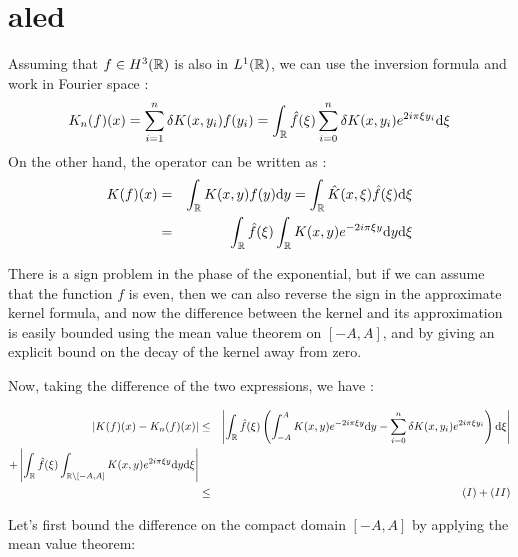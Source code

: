 \documentclass[11pt,a4paper]{article}
\begin{document}
\section{aled}

Assuming that $f\in H^3(\mathbb R)$ is also in $L^1(\mathbb R)$, we can use the inversion formula and work in Fourier space :
\begin{equation}\label{int_finite}
K_n(f)(x) =  \sum_{i=1}^n\delta K(x,y_i)f(y_i) = \int_\mathbb R \hat{f}(\xi)\sum_{i=0}^n \delta K(x,y_i) e^{2i\pi\xi y_i}\mathrm{d}\xi
\end{equation}
On the other hand, the operator can be written as :
\begin{eqnarray*}
K(f)(x) &=& \int_\mathbb R K(x,y)f(y)\mathrm{d}y = \int_\mathbb R \hat{K}(x,\xi)\hat{f}(\xi)\mathrm{d}\xi \\
&=& \int_\mathbb R \hat{f}(\xi) \int_\mathbb R K(x,y)e^{-2i\pi\xi y}\mathrm{d}y \mathrm{d}\xi 
\end{eqnarray*}

There is a sign problem in the phase of the exponential, but if we can assume that the function $f$ is even, then we can also reverse the sign in the approximate kernel formula, and now the difference between the kernel and its approximation is easily bounded using the mean value theorem on $[-A,A]$, and by giving an explicit bound on the decay of the kernel away from zero. 

Now, taking the difference of the two expressions, we have :

\begin{eqnarray*}
\left| K(f)(x) - K_n(f)(x)\right| &\leq& \left|  \int_\mathbb R \hat{f}(\xi) \left(\int_{-A}^A K(x,y)e^{-2i\pi\xi y}\mathrm{d}y - \sum_{i=0}^n \delta K(x,y_i) e^{2i\pi\xi y_i} \right)\mathrm{d}\xi \right| \\ + \left|\int_\mathbb R \hat{f}(\xi) \int_{\mathbb R \setminus [-A,A]} K(x,y)e^{2i\pi\xi y}\mathrm{d}y\mathrm{d}\xi \right| \\
&\leq& (I) + (II)
\end{eqnarray*}

Let's first bound the difference on the compact domain $[-A,A]$ by applying the mean value theorem:
\end{document}
